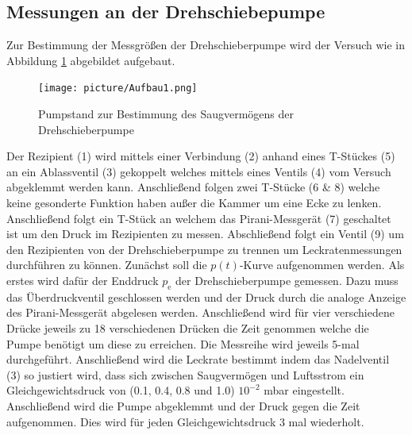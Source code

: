 \subsection{Messungen an der Drehschiebepumpe}
Zur Bestimmung der Messgrößen der Drehschieberpumpe wird der Versuch wie in Abbildung \ref{fig:Dreh} abgebildet aufgebaut.
\begin{figure}[htpb]
  \centering
  \texttt{[image: picture/Aufbau1.png]}
  \caption{Pumpstand zur Bestimmung des Saugvermögens der Drehschieberpumpe}
  \label{fig:Dreh}
\end{figure}
Der Rezipient (1) wird mittels einer Verbindung (2) anhand eines T-Stückes (5) an ein Ablassventil (3) gekoppelt welches mittels eines Ventils (4) vom Versuch abgeklemmt werden kann. Anschließend folgen zwei T-Stücke (6 \& 8) welche keine gesonderte Funktion haben außer die Kammer um eine Ecke zu lenken. Anschließend folgt ein T-Stück an welchem das Pirani-Messgerät (7) geschaltet ist um den Druck im Rezipienten zu messen. Abschließend folgt ein Ventil (9) um den Rezipienten von der Drehschieberpumpe zu trennen um Leckratenmessungen durchführen zu können. \newline
Zunächst soll die $p(t)$-Kurve aufgenommen werden. Als erstes wird dafür der Enddruck $p_\text{e}$ der Drehschieberpumpe gemessen. Dazu muss das Überdruckventil geschlossen werden und der Druck durch die analoge Anzeige des Pirani-Messgerät abgelesen werden. Anschließend wird für vier verschiedene Drücke jeweils zu 18 verschiedenen Drücken die Zeit genommen welche die Pumpe benötigt um diese zu erreichen. Die Messreihe wird jeweils 5-mal durchgeführt. \newline
Anschließend wird die Leckrate bestimmt indem das Nadelventil (3) so justiert wird, dass sich zwischen Saugvermögen und Luftsstrom ein Gleichgewichtsdruck von (0.1, 0.4, 0.8 und 1.0) \cdot $10^{-2}$ mbar eingestellt. Anschließend wird die Pumpe abgeklemmt und der Druck gegen die Zeit aufgenommen. Dies wird für jeden Gleichgewichtsdruck 3 mal wiederholt.  \newline
